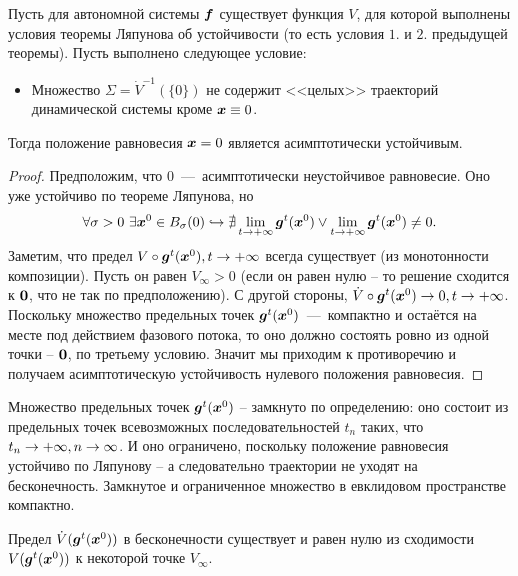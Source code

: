 \begin{theorem}
    Пусть для автономной системы $\boldsymbol{f}$ существует функция $V$, для которой выполнены условия теоремы Ляпунова об устойчивости (то есть условия $1.$ и $2.$ предыдущей теоремы).
    Пусть выполнено следующее условие:
    \begin{itemize}
        \item[3.] Множество $\Sigma = \dot{V}^{-1}(\{0\})$ не содержит <<целых>> траекторий динамической системы кроме $\boldsymbol{x} \equiv 0$.
    \end{itemize}
    Тогда положение равновесия $\boldsymbol{x} = 0$ является асимптотически устойчивым.
\end{theorem}
\begin{proof}
    Предположим, что $0$~---~асимптотически неустойчивое равновесие.
    Оно уже устойчиво по теореме Ляпунова, но
    \[
        \forall \sigma > 0 \  \exists \boldsymbol{x}^0 \in B_{\sigma}(0) \hookrightarrow \nexists \lim\limits_{t \rightarrow +\infty} \boldsymbol{g}^t(\boldsymbol{x}^0) \vee \lim\limits_{t \rightarrow +\infty} \boldsymbol{g}^{t}(\boldsymbol{x}^0) \neq 0.
    \]
    Заметим, что предел $V \circ \boldsymbol{g}^{t}(\boldsymbol{x}^0), t \rightarrow +\infty$ всегда существует (из монотонности композиции).
    Пусть он равен $V_\infty > 0$ (если он равен нулю -- то решение сходится к $\boldsymbol{0}$, что не так по предположению).
    С другой стороны, $\dot{V} \circ \boldsymbol{g}^t(\boldsymbol{x}^0) \rightarrow 0, t \rightarrow +\infty$.
    Поскольку множество предельных точек $\boldsymbol{g}^t(\boldsymbol{x}^0)$~---~компактно и остаётся на месте под действием фазового потока, то оно должно состоять ровно из одной точки -- $\boldsymbol{0}$, по третьему условию.
    Значит мы приходим к противоречию и получаем асимптотическую устойчивость нулевого положения равновесия.
\end{proof}
\begin{note}
    Множество предельных точек $\boldsymbol{g}^t(\boldsymbol{x}^0)$ -- замкнуто по определению: оно состоит из предельных точек всевозможных последовательностей $t_n$ таких, что $t_n \rightarrow +\infty, n \rightarrow \infty$.
    И оно ограничено, поскольку положение равновесия устойчиво по Ляпунову -- а следовательно траектории не уходят на бесконечность.
    Замкнутое и ограниченное множество в евклидовом пространстве компактно.
\end{note}
\begin{note}
    Предел $\dot{V}(\boldsymbol{g}^t(\boldsymbol{x}^0))$ в бесконечности существует и равен нулю из сходимости $V(\boldsymbol{g}^t(\boldsymbol{x}^0))$ к некоторой точке $V_\infty$.
\end{note}
